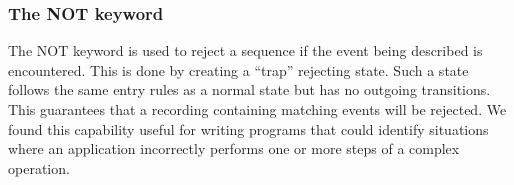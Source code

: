 \subsubsection{The NOT keyword}
\label{subsub:NOT}

The NOT keyword is used to reject a sequence if the event being
described is encountered.  This is done by creating a ``trap''
rejecting state.  Such a state follows the same entry rules
as a normal state but has no outgoing transitions.  This guarantees that a
recording containing matching events will be rejected.
We found this capability useful for writing programs that could identify
situations where an application incorrectly performs one or more steps of a
complex operation.



\fi



